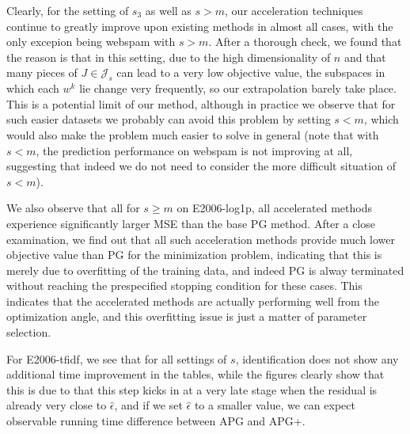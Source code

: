 \documentclass{article}
\theoremstyle{plain}
\theoremstyle{definition}
\theoremstyle{remark}
\newcommand*{\lmss}{\fontfamily{lmss}\selectfont}
\newcommand{\J}{\mathcal{J}}
\def\webspam{{\lmss webspam}\xspace}
\def\El{{\lmss E2006-log1p}\xspace}
\def\Et{{\lmss E2006-tfidf}\xspace}
\begin{document}
Clearly, for the setting of $s_3$ as well as $s > m$, our acceleration
techniques continue to greatly improve upon existing methods in almost
all cases, with the only excepion being \webspam with $s > m$.
After a thorough check, we found that the reason is that in this
setting, due to the high dimensionality of $n$ and that many pieces of
$J \in \J_s$ can lead to a very low objective value, the subspaces in
which each $w^k$ lie change very frequently, so our extrapolation
barely take place.
This is a potential limit of our method, although in practice we
observe that for such easier datasets we probably can avoid this
problem by setting $s < m$, which would also make the problem much
easier to solve in general (note that with $s < m$, the prediction
performance on \webspam is not improving at all, suggesting that
indeed we do not need to consider the more difficult situation of $s <
m$).

We also observe that all for $s \geq m$ on \El, all accelerated
methods experience significantly larger MSE than the base PG method.
After a close examination, we find out that all such acceleration
methods provide much lower objective value than PG for the
minimization problem, indicating that this is merely due to
overfitting of the training data, and indeed PG is alway terminated
without reaching the prespecified stopping condition for these cases.
This indicates that the accelerated methods are actually performing well
from the optimization angle, and this overfitting issue is just a
matter of parameter selection.

For \Et, we see that for all settings of $s$,
identification does not show any additional time improvement in the
tables, while the figures clearly show that this is due to that this
step kicks in at a very late stage when the residual is already very
close to $\hat \epsilon$, and if we set $\hat \epsilon$ to a  smaller
value, we can expect observable running time difference between APG
and APG+.
\end{document}
